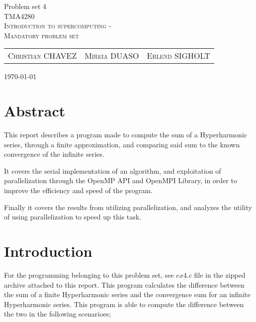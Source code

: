 \documentclass[fontsize=11pt,paper=a4,titlepage]{report}
\begin{document}
\begin{center}


{\huge Problem set 4}\\[0.5cm]

\textsc{\LARGE TMA4280}\\[0.5cm]
\textsc{\large Introduction to supercomputing -}\\
\textsc{\large Mandatory problem set}\\[0.6cm]

\begin{table}[h]
\centering
\begin{tabular}{ccc}
	\textsc{Christian CHAVEZ}	&	\textsc{Mireia DUASO}	&	\textsc{Erlend SIGHOLT}
\end{tabular}
\end{table}

\large{\today}
\vfill
\section*{Abstract}
This report describes a program made to compute the sum of a Hyperharmonic series, through a finite approximation, and comparing said sum to the known convergence of the infinite series.

It covers the serial implementation of an algorithm, and exploitation of parallelization through the OpenMP API and OpenMPI Library, in order to improve the efficiency and speed of the program.

Finally it covers the results from utilizing parallelization, and analyzes the utility of using parallelization to speed up this task.

\end{center}

\addtocounter{chapter}{1}

\clearpage
\section{Introduction}

For the programming belonging to this problem set, see $\textit{ex4.c}$ file in
the zipped archive attached to this report. This program calculates the
difference between the sum of a finite Hyperharmonic series and the convergence
sum for an infinite Hyperharmonic series. This program is able to compute the
difference between the two in the following scenarioes;
\end{document}
